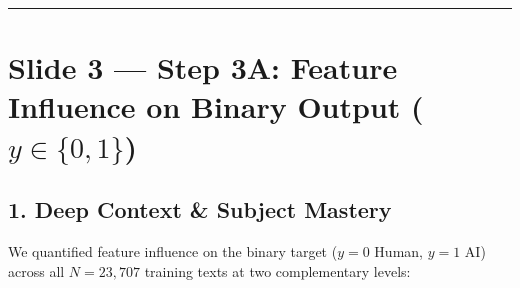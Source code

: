 \documentclass[11pt, a4paper]{article}
\begin{document}
\vspace{0.3cm}\hrule\vspace{0.3cm}

\section{Slide 3 --- Step 3A: Feature Influence on Binary Output ($y \in \{0, 1\}$)}

\subsection*{1. Deep Context \& Subject Mastery}
We quantified feature influence on the binary target ($y=0$ Human, $y=1$ AI) across all $N = 23,707$ training texts at two complementary levels:
\end{document}
